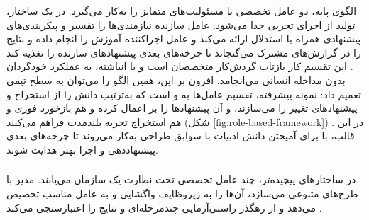 الگوی پایه، دو عامل تخصصی با مسئولیت‌های متمایز را به‌کار می‌گیرد. در یک ساختار، تولید  از اجرای تجربی جدا می‌شود: عامل سازنده نیازمندی‌ها را تفسیر و پیکربندی‌های پیشنهادی همراه با استدلال ارائه می‌کند و عامل اجراکننده آموزش را انجام داده و نتایج را در گزارش‌های مشترک می‌گنجاند تا چرخه‌های بعدی پیشنهادهای سازنده را تغذیه کند \cite{liu2025agenthpo}. این تقسیم کار بازتاب گردش‌کار متخصصان است و با  انباشته، به عملکرد خودگردان بدون مداخله انسانی می‌انجامد. افزون بر این، همین الگو را می‌توان به سطح تیمی تعمیم داد: نمونه پیشرفته، تقسیم عامل‌ها به  و  است که به‌ترتیب دانش را از  استخراج و پیشنهادهای تغییر را می‌سازند، و آن پیشنهادها را بر  اعمال کرده و هم بازخورد فوری و هم استخراج تجربه بلندمدت فراهم می‌کنند (شکل \ref{fig:role-based-framework}) \cite{Yang2025NADER}. در این قالب،  با  برای آمیختن دانش ادبیات با سوابق طراحی به‌کار می‌روند تا چرخه‌های بعدی پیشنهاددهی و اجرا بهتر هدایت شوند.

\subsubsection{\protect{}}
در ساختارهای پیچیده‌تر، چند عامل تخصصی تحت نظارت یک  سازمان می‌یابند. مدیر با  طرح‌های متنوعی می‌سازد، آن‌ها را به زیروظایف  واگشایی و به عامل مناسب تخصیص می‌دهد و از رهگذر راستی‌آزمایی چندمرحله‌ای و  نتایج را اعتبارسنجی می‌کند \cite{trirat2025automlagent}.
